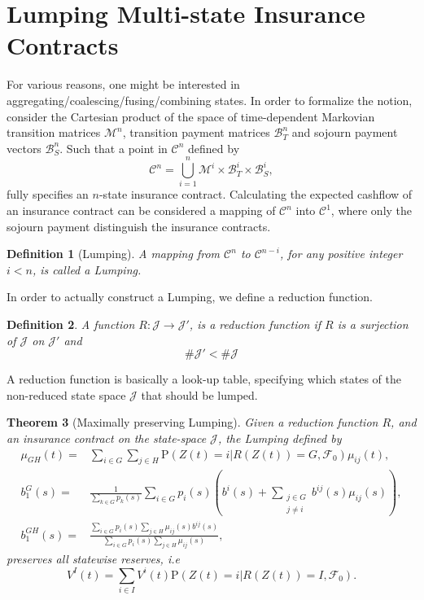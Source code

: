 \documentclass[12pt]{article}
\newcommand\ddfrac[2]{\frac{\displaystyle #1}{\displaystyle #2}}
\newcommand{\noin}{\noindent}
\renewcommand{\P}{\text{P}}
\theoremstyle{my_thm}
\newtheorem{thm}{Theorem}[section]
\theoremstyle{my_def}
\newtheorem{defn}[thm]{Definition}
\theoremstyle{my_thm2}
\begin{document}
\section*{Lumping Multi-state Insurance Contracts}
For various reasons, one might be interested in aggregating/coalescing/fusing/combining states. In order to formalize the notion, consider the Cartesian product of the space of time-dependent Markovian transition matrices $\mathcal{M}^n$, transition payment matrices $\mathcal{B}_T^n$ and sojourn payment vectors $\mathcal{B}_S^n$. Such that a point in $\mathcal{C}^n$ defined by
$$
\mathcal{C}^n= \bigcup_{i=1}^n  \mathcal{M}^i  \times  \mathcal{B}_T^i \times  \mathcal{B}_S^i,
$$ 
fully specifies an $n$-state insurance contract. Calculating the expected cashflow of an insurance contract can be considered a mapping of $\mathcal{C}^n$ into $\mathcal{C}^1$, where only the sojourn payment distinguish the insurance contracts. 
\begin{defn}[Lumping]
A mapping from $\mathcal{C}^n$ to $\mathcal{C}^{n-i}$, for any positive integer $i<n$, is called a Lumping.
\end{defn}
\noin In order to actually construct a Lumping, we define a reduction function.
\begin{defn}
A function $R: \mathcal{J} \rightarrow \mathcal{J}'$, is a reduction function if $R$ is a surjection of $\mathcal{J}$ on $\mathcal{J}'$ and
$$
\# \mathcal{J}' < \# \mathcal{J}
$$
\end{defn}
A reduction function is basically a look-up table, specifying which states of the non-reduced state space $\mathcal{J}$ that should be lumped.
\begin{thm}[Maximally preserving Lumping]
Given a reduction function $R$, and an insurance contract on the state-space $\mathcal{J}$, the Lumping defined by
\begin{align*}
\mu_{GH}(t)=&\sum_{i \in G}\sum_{j \in H} \P(Z(t)=i |R(Z(t)) = G, \mathcal{F}_0) \mu_{ij}(t),
\\
b_1^G(s)=&\frac{1}{\sum_{k \in G}p_k(s)} \sum_{i \in G} p_i(s) \left( b^i(s) + \sum_{ \substack{j \in G \\j \neq i}} b^{ij}(s) \mu_{ij}(s) \right),
\\
b_1^{GH}(s)=& \ddfrac{\sum_{i \in G} p_i(s)\sum_{j \in H} \mu_{ij}(s)b^{ij}(s)}{\sum_{i \in G} p_i(s)\sum_{j \in H} \mu_{ij}(s)},
\end{align*}
preserves all statewise reserves, i.e
$$
V^I(t)=\sum_{i \in I} V^i(t)  \P(Z(t)=i |R(Z(t)) = I, \mathcal{F}_0).
$$
\end{thm}
\end{document}
